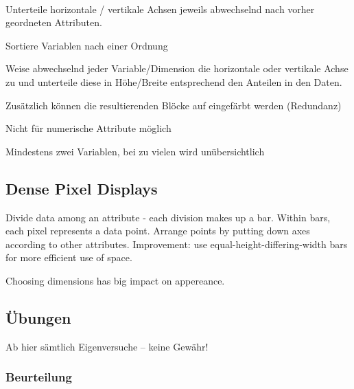 \documentclass[10pt]{article} %
\begin{document}
\begin{definition}  \\
  Unterteile horizontale / vertikale Achsen jeweils abwechselnd nach vorher
  geordneten Attributen.
  \begin{cptenumerate}
  \item Sortiere Variablen nach einer Ordnung
  \item Weise abwechselnd jeder Variable/Dimension die horizontale oder
    vertikale Achse zu und unterteile diese in Höhe/Breite entsprechend den
    Anteilen in den Daten.
  \item Zusätzlich können die resultierenden Blöcke auf eingefärbt werden (Redundanz)
  \end{cptenumerate}
  \begin{cptitemize}
  \item Nicht für numerische Attribute möglich
  \item Mindestens zwei Variablen, bei zu vielen wird unübersichtlich
  \end{cptitemize}
\end{definition}


\subsection{Dense Pixel Displays}

\begin{definition}
  Divide data among an attribute - each division makes up a bar. Within bars,
  each pixel represents a data point. Arrange points by putting down axes
  according to other attributes. Improvement: use equal-height-differing-width
  bars for more efficient use of space.
  \begin{cptitemize}
    \disadvantageit Choosing dimensions has big impact on appereance.
  \end{cptitemize}
\end{definition}




\subsection{Übungen}
Ab hier sämtlich Eigenversuche -- keine Gewähr!
\subsubsection{Beurteilung}
\end{document}
